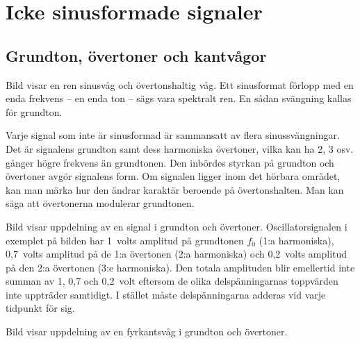 \newpage
\section{Icke sinusformade signaler}

\subsection{Grundton, övertoner och kant\-vågor}
\label{övertoner}


Bild  visar en ren sinusvåg och övertonshaltig våg.
Ett sinusformat förlopp med en enda frekvens -- en enda ton -- sägs vara
spektralt ren.
En sådan svängning kallas för grundton.

Varje signal som inte är sinusformad är sammansatt av flera sinussvängningar.
Det är signalens grundton samt dess harmoniska övertoner, vilka kan ha 2, 3
osv. gånger högre frekvens än grundtonen.
Den inbördes styrkan på grundton och övertoner avgör signalens form.
Om signalen ligger inom det hörbara området, kan man märka hur den ändrar
karaktär beroende på övertonshalten.
Man kan säga att övertonerna modulerar grundtonen.


Bild  visar uppdelning av en signal i grundton och
övertoner.
Oscillatorsignalen i exemplet på bilden har 1~volts amplitud på grundtonen
\(f_0\) (1:a harmoniska), 0,7~volts amplitud på de 1:a övertonen
(2:a harmoniska) och 0,2~volts amplitud på den 2:a övertonen (3:e harmoniska).
Den totala amplituden blir emellertid inte summan av 1, 0,7 och 0,2~volt
eftersom de olika delspänningarnas toppvärden inte uppträder samtidigt.
I stället måste delspänningarna adderas vid varje tidpunkt för sig.


Bild  visar uppdelning av en fyrkantsvåg i grundton och
övertoner.

